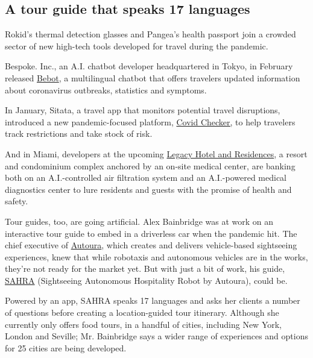\hypertarget{a-tour-guide-that-speaks-17-languages}{%
\subsection{A tour guide that speaks 17
languages}\label{a-tour-guide-that-speaks-17-languages}}

Rokid's thermal detection glasses and Pangea's health passport join a
crowded sector of new high-tech tools developed for travel during the
pandemic.

Bespoke. Inc., an A.I. chatbot developer headquartered in Tokyo, in
February released \href{https://www.be-spoke.io/bebot/}{Bebot}, a
multilingual chatbot that offers travelers updated information about
coronavirus outbreaks, statistics and symptoms.

In January, Sitata, a travel app that monitors potential travel
disruptions, introduced a new pandemic-focused platform,
\href{https://www.covidchecker.com/en/}{Covid Checker,} to help
travelers track restrictions and take stock of risk.

And in Miami, developers at the upcoming
\href{https://www.legacymwc.com/}{Legacy Hotel and Residences}, a resort
and condominium complex anchored by an on-site medical center, are
banking both on an A.I.-controlled air filtration system and an
A.I.-powered medical diagnostics center to lure residents and guests
with the promise of health and safety.

Tour guides, too, are going artificial. Alex Bainbridge was at work on
an interactive tour guide to embed in a driverless car when the pandemic
hit. The chief executive of \href{https://www.autoura.com/}{Autoura},
which creates and delivers vehicle-based sightseeing experiences, knew
that while robotaxis and autonomous vehicles are in the works, they're
not ready for the market yet. But with just a bit of work, his guide,
\href{https://apps.apple.com/us/app/sahra/id1515905101}{SAHRA}
(Sightseeing Autonomous Hospitality Robot by Autoura), could be.

Powered by an app, SAHRA speaks 17 languages and asks her clients a
number of questions before creating a location-guided tour itinerary.
Although she currently only offers food tours, in a handful of cities,
including New York, London and Seville; Mr. Bainbridge says a wider
range of experiences and options for 25 cities are being developed.

\href{https://www.nytimes.com/news-event/coronavirus?action=click\&pgtype=Article\&state=default\&region=MAIN_CONTENT_3\&context=storylines_faq}{}

